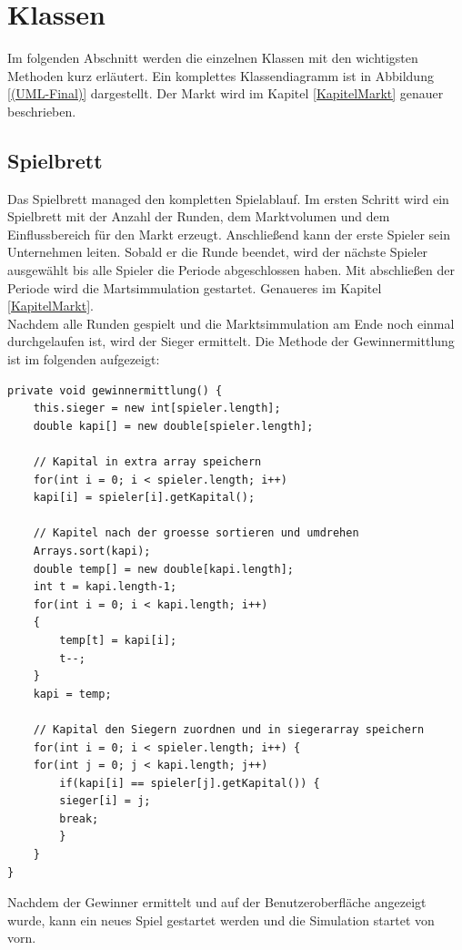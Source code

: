 \newpage
\section{Klassen}
Im folgenden Abschnitt werden die einzelnen Klassen mit den wichtigsten Methoden kurz erläutert. Ein komplettes Klassendiagramm ist in Abbildung \ref{(UML-Final)} dargestellt. Der Markt wird im Kapitel \ref{KapitelMarkt} genauer beschrieben.

\subsection{Spielbrett}
Das Spielbrett managed den kompletten Spielablauf. Im ersten Schritt wird ein Spielbrett mit der Anzahl der Runden, dem Marktvolumen und dem Einflussbereich für den Markt erzeugt. Anschließend kann der erste Spieler sein Unternehmen leiten. Sobald er die Runde beendet, wird der nächste Spieler ausgewählt bis alle Spieler die Periode abgeschlossen haben. Mit abschließen der Periode wird die Martsimmulation gestartet. Genaueres im Kapitel \ref{KapitelMarkt}. \\
Nachdem alle Runden gespielt und die Marktsimmulation am Ende noch einmal durchgelaufen ist, wird der Sieger ermittelt. Die Methode der Gewinnermittlung ist im folgenden aufgezeigt: \\

\lstset{language=Java} 
\begin{lstlisting}
private void gewinnermittlung() {
	this.sieger = new int[spieler.length];
	double kapi[] = new double[spieler.length];
	
	// Kapital in extra array speichern
	for(int i = 0; i < spieler.length; i++)
	kapi[i] = spieler[i].getKapital();
	
	// Kapitel nach der groesse sortieren und umdrehen		
	Arrays.sort(kapi);
	double temp[] = new double[kapi.length];
	int t = kapi.length-1;
	for(int i = 0; i < kapi.length; i++)
	{
		temp[t] = kapi[i];
		t--;
	}
	kapi = temp;
	
	// Kapital den Siegern zuordnen und in siegerarray speichern
	for(int i = 0; i < spieler.length; i++) {
	for(int j = 0; j < kapi.length; j++)
		if(kapi[i] == spieler[j].getKapital()) {
		sieger[i] = j;
		break;
		}
	}
}
\end{lstlisting}

Nachdem der Gewinner ermittelt und auf der Benutzeroberfläche angezeigt wurde, kann ein neues Spiel gestartet werden und die Simulation startet von vorn.




